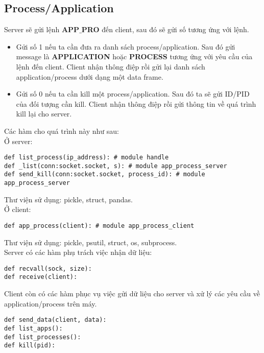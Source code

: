 \subsection{Process/Application}
Server sẽ gửi lệnh \textbf{APP$\_$PRO} đến client, sau đó sẽ gửi số tương ứng với lệnh.
\begin{itemize}
\item Gửi số 1 nếu ta cần đưa ra danh sách process/application. Sau đó gửi message là \textbf{APPLICATION} hoặc \textbf{PROCESS} tương ứng với yêu cầu của lệnh đến client. Client nhận thông điệp rồi gửi lại danh sách application/process dưới dạng một data frame.
\item Gửi số 0 nếu ta cần kill một process/application. Sau đó ta sẽ gửi ID/PID của đối tượng cần kill. Client nhận thông điệp rồi gửi thông tin về quá trình kill lại cho server.
\end{itemize}
Các hàm cho quá trình này như sau:\\
Ở server:
\begin{lstlisting}
def list_process(ip_address): # module handle
def _list(conn:socket.socket, s): # module app_process_server
def send_kill(conn:socket.socket, process_id): # module app_process_server
\end{lstlisting}
Thư viện sử dụng: pickle, struct, pandas.\\
Ở client:
\begin{lstlisting}
def app_process(client): # module app_process_client
\end{lstlisting}
Thư viện sử dụng: pickle, psutil, struct, os, subprocess.\\
Server có các hàm phụ trách việc nhận dữ liệu:
\begin{lstlisting}
def recvall(sock, size):
def receive(client):
\end{lstlisting}
Client còn có các hàm phục vụ việc gửi dữ liệu cho server và xử lý các yêu cầu về application/process trên máy.
\begin{lstlisting}
def send_data(client, data):
def list_apps():
def list_processes():
def kill(pid):
\end{lstlisting}
